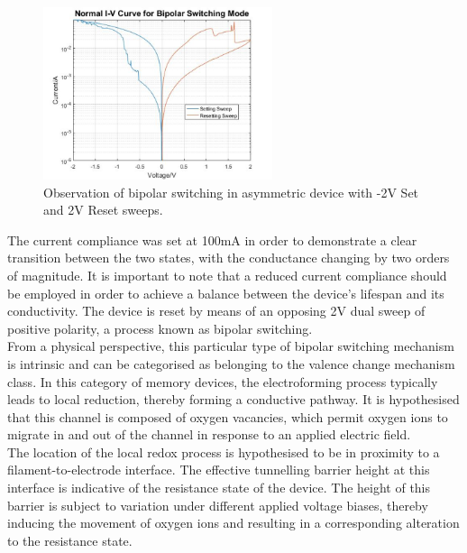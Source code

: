 \begin{figure}[htbp!] 
    \centering    
    \includegraphics[width=0.6\textwidth]{Chapter3/Figs/m.png}
    \caption[Observation of bipolar switching in asymmetric device with -2V Set and 2V Reset sweeps.]{Observation of bipolar switching in asymmetric device with -2V Set and 2V Reset sweeps.}
    \label{fig:3m}
\end{figure}

\noindent The current compliance was set at 100mA in order to demonstrate a clear transition between the two states, with the conductance changing by two orders of magnitude. It is important to note that a reduced current compliance should be employed in order to achieve a balance between the device's lifespan and its conductivity. The device is reset by means of an opposing 2V dual sweep of positive polarity, a process known as bipolar switching.\\


\noindent From a physical perspective, this particular type of bipolar switching mechanism is intrinsic and can be categorised as belonging to the valence change mechanism class. In this category of memory devices, the electroforming process typically leads to local reduction, thereby forming a conductive pathway. It is hypothesised that this channel is composed of oxygen vacancies, which permit oxygen ions to migrate in and out of the channel in response to an applied electric field. \\


\noindent The location of the local redox process is hypothesised to be in proximity to a filament-to-electrode interface. The effective tunnelling barrier height at this interface is indicative of the resistance state of the device. The height of this barrier is subject to variation under different applied voltage biases, thereby inducing the movement of oxygen ions and resulting in a corresponding alteration to the resistance state. \\

